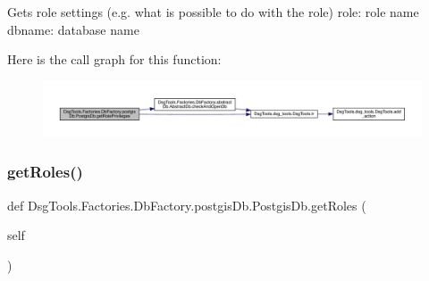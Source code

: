 \begin{DoxyVerb}Gets role settings (e.g. what is possible to do with the role)
role: role name
dbname: database name
\end{DoxyVerb}
 Here is the call graph for this function\+:
\nopagebreak
\begin{figure}[H]
\begin{center}
\leavevmode
\includegraphics[width=350pt]{class_dsg_tools_1_1_factories_1_1_db_factory_1_1postgis_db_1_1_postgis_db_ab038bb83ac22cc36e91780ad3b5f447d_cgraph}
\end{center}
\end{figure}
\mbox{\label{class_dsg_tools_1_1_factories_1_1_db_factory_1_1postgis_db_1_1_postgis_db_af105326db5d4561a3efceb80427a638e}} 
\subsubsection{\texorpdfstring{get\+Roles()}{getRoles()}}
{\footnotesize\ttfamily def Dsg\+Tools.\+Factories.\+Db\+Factory.\+postgis\+Db.\+Postgis\+Db.\+get\+Roles (\begin{DoxyParamCaption}\item[{}]{self }\end{DoxyParamCaption})}

